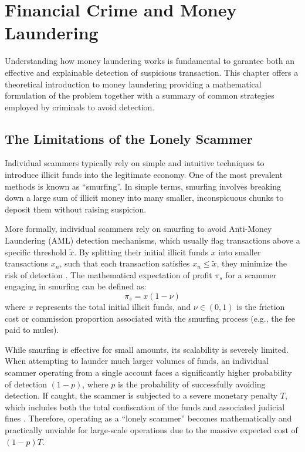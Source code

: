 \chapter{Financial Crime and Money Laundering}
\label{moneyLaundering}
Understanding how money laundering works is fundamental to garantee both an effective and explainable detection of suspicious transaction. 
This chapter offers a theoretical introduction to money laundering providing a mathematical formulation of the problem together with a summary of common strategies employed by criminals to avoid detection.
\section{The Limitations of the Lonely Scammer}
Individual scammers typically rely on simple and intuitive techniques to introduce illicit funds into the legitimate economy. One of the most prevalent methods is known as ``smurfing''. In simple terms, smurfing involves breaking down a large sum of illicit money into many smaller, inconspicuous chunks to deposit them without raising suspicion. 

More formally, individual scammers rely on smurfing to avoid Anti-Money Laundering (AML) detection mechanisms, which usually flag transactions above a specific threshold $\tilde{x}$. By splitting their initial illicit funds $x$ into smaller transactions $x_n$, such that each transaction satisfies $x_n \leq \tilde{x}$, they minimize the risk of detection \cite{contreras2026strategic}. The mathematical expectation of profit $\pi_s$ for a scammer engaging in smurfing can be defined as:
\begin{equation}
    \pi_s = x(1-\nu)
\end{equation}
where $x$ represents the total initial illicit funds, and $\nu \in (0,1)$ is the friction cost or commission proportion associated with the smurfing process (e.g., the fee paid to mules). 

While smurfing is effective for small amounts, its scalability is severely limited. When attempting to launder much larger volumes of funds, an individual scammer operating from a single account faces a significantly higher probability of detection $(1-p)$, where $p$ is the probability of successfully avoiding detection. If caught, the scammer is subjected to a severe monetary penalty $T$, which includes both the total confiscation of the funds and associated judicial fines \cite{contreras2026strategic}. Therefore, operating as a ``lonely scammer'' becomes mathematically and practically unviable for large-scale operations due to the massive expected cost of $(1-p)T$.

